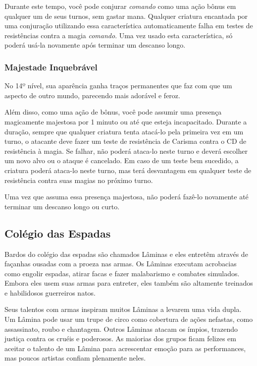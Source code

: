 \begin{multicols}{2}
Durante este tempo, você pode conjurar \textit{comando} como uma ação bônus em
qualquer um de seus turnos, sem gastar mana. Qualquer criatura encantada por uma
conjuração utilizando essa característica automaticamente falha em testes de
resistências contra a magia \textit{comando}. Uma vez usado esta característica,
só poderá usá-la novamente após terminar um descanso longo.

\subsubsection{Majestade Inquebrável}%

No 14º nível, sua aparência ganha traços permanentes que faz com que um aspecto
de outro mundo, parecendo mais adorável e feroz.

Além disso, como uma ação de bônus, você pode assumir uma presença magicamente
majestosa por 1 minuto ou até que esteja incapacitado. Durante a duração, sempre
que qualquer criatura tenta atacá-lo pela primeira vez em um turno, o atacante
deve fazer um teste de resistência de Carisma contra o CD de resistência à
magia. Se falhar, não poderá ataca-lo neste turno e deverá escolher um novo alvo
ou o ataque é cancelado. Em caso de um teste bem sucedido, a criatura poderá
ataca-lo neste turno, mas terá desvantagem em qualquer teste de resistência
contra suas magias no próximo turno.

Uma vez que assuma essa presença majestosa, não poderá fazê-lo novamente até
terminar um descanso longo ou curto.

\subsection*{Colégio das Espadas}%

Bardos do colégio das espadas são chamados Lâminas e eles entretêm através de
façanhas ousadas com a proeza nas armas. Os Lâminas executam acrobacias como
engolir espadas, atirar facas e fazer malabarismo e combates simulados. Embora
eles usem suas armas para entreter, eles também são altamente treinados e
habilidosos guerreiros natos.

Seus talentos com armas inspiram muitos Lâminas a levarem uma vida dupla. Um
Lâmina pode usar um trupe de circo como cobertura de ações nefastas, como
assassinato, roubo e chantagem. Outros Lâminas atacam os ímpios, trazendo
justiça contra os cruéis e poderosos. As maiorias dos grupos ficam felizes em
aceitar o talento de um Lâmina para acrescentar emoção para as performances, mas
poucos artistas confiam plenamente neles.


\end{multicols}
